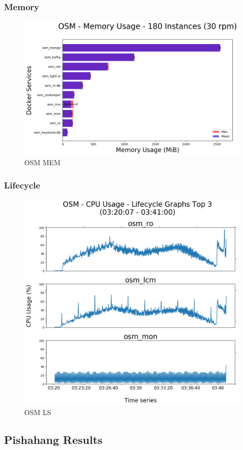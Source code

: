 \subsubsection{Memory}

\begin{figure}[h]
	\centering
	\includegraphics[width=0.7\linewidth]{../figures/scalability_graphs/Horizontal-Docker-Graphs/osm/cirros_case1_180-MEM}
	\caption{OSM MEM}
	\label{fig:cirroscase1180-mem}
\end{figure}

\subsubsection{Lifecycle}

\begin{figure}[h]
	\centering
	\includegraphics[width=0.7\linewidth]{figures/scalability_graphs/Lifecycle-Graphs-Top-3/OSM-TOP-3-Lifecycle}
	\caption{OSM LS}
	\label{fig:osm-top-3-lifecycle}
\end{figure}


\subsection{Pishahang Results}

